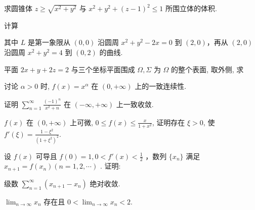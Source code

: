 \par{}
求圆锥体 $z \geq \sqrt{x^2 + y^2}$ 与 $x^2 + y^2 + (z - 1)^2 \leq 1$ 所围立体的体积.\par
\par{}
\par{}
计算\par
\nopagebreak[4]
其中 $L$ 是第一象限从 $(0,0)$ 沿圆周 $x^{2} + y^{2} - 2x = 0$ 到 $(2,0)$，再从 $(2,0)$ 沿圆周 $x^{2} + y^{2} = 4$ 到 $(0,2)$ 的曲线.\par
\par{}
\par{}
平面 $2x + y + 2z = 2$ 与三个坐标平面围成 $\Omega, \Sigma$ 为 $\Omega$ 的整个表面, 取外侧, 求\par
\nopagebreak[4]
\par{}
讨论 $\alpha > 0$ 时, $f(x) = x^{\alpha}$ 在 $(0, +\infty)$ 上的一致连续性.\par
\par{}
证明 $\sum_{n=1}^{\infty} \frac{(-1)^n}{x^2 + n}$ 在 $(- \infty, +\infty)$ 上一致收敛.\par
\par{}
$f(x)$ 在 $(0, +\infty)$ 上可微, $0 \leq f(x) \leq \frac{x}{1 + x^2}$, 证明存在 $\xi > 0$, 使 $f'(\xi) = \frac{1 - \xi^2}{(1 + \xi^2)^2}$.\par
\par{}
设  $f(x)$  可导且  $f(0)=1, 0 < f'(x) < \frac{1}{2}$ ，数列  $\{x_{n}\}$  满足  $x_{n+1}=f(x_{n}) (n=1,2,\cdots)$ . 证明:\par
级数 $\sum_{n=1}^{\infty}(x_{n+1} - x_n)$ 绝对收敛.\par
$\lim_{n\to \infty}x_n$ 存在且 $0 < \lim_{n\to \infty}x_n < 2.$\par
